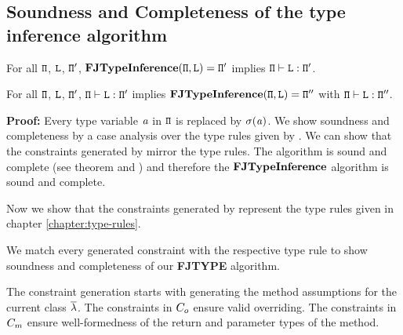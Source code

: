 \documentclass[a4paper,USenglish,cleveref, autoref, thm-restate, anonymous]{lipics-v2021}
\begin{document}
\subsection{Soundness and Completeness of the type inference algorithm}
\begin{theorem}[Soundness] For all ${\tt \Pi}$, ${\tt L}$, ${\tt \Pi'}$, 
  $\textbf{FJTypeInference}({\tt \Pi},\texttt{L}) = {\tt \Pi}'$ implies ${\tt \Pi} \vdash \texttt{L} : {\tt \Pi}'$.
\end{theorem}
\begin{theorem}[Completeness]  For all ${\tt \Pi}$, ${\tt L}$, ${\tt \Pi'}$,
  ${\tt \Pi} \vdash \texttt{L} : {\tt \Pi}'$ implies $\textbf{FJTypeInference}({\tt \Pi},\texttt{L}) = {\tt \Pi}''$ with ${\tt \Pi} \vdash \texttt{L} : {\tt \Pi}''$.
\end{theorem}
\textbf{Proof:}
Every type variable $\mathit{ a }$ in ${\tt \Pi}$ is replaced by $\sigma(\mathit{ a })$.
We show soundness and completeness by a case analysis over the type rules given by \TFGJ{}.
We can show that the constraints generated by \fjtype{} mirror the \TFGJ{} type rules.
The \unify{} algorithm is sound and complete (see theorem \label{theo:unifySoundness} and \label{theo:unifyCompleteness})
and therefore the $\textbf{FJTypeInference}$ algorithm is sound and complete.

Now we show that the constraints generated by \unify{}
represent the type rules given in chapter \ref{chapter:type-rules}.



We match every generated constraint with the respective type rule to show soundness and completeness of our \textbf{FJTYPE} algorithm.

The constraint generation starts with generating the method assumptions for the current class $\overline{\mathtt{\lambda}}$.
The constraints in $C_o$ ensure valid overriding.
The constraints in $C_m$ ensure well-formedness of the return and parameter types of the method.
\end{document}
